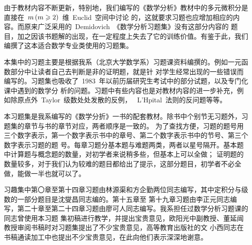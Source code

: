 
\begin{preface}

由于教材内容不断更新，特别地，我们编写的《数学分析》教材中的多元微积分是直接在~$m\mcond{m\geq2}$~维~Euclid~空间中讨论
的，这就要求习题也应增加相应的内容。而原来广泛采用的~Demidovich~《数学分析习题集》没有这部分内容的
题目，加之因该书题解的出现，在一定程度上失去了它的训练价值。有鉴于此，我们编撰了这本适合数学专业类使用的习题集。

本集中的习题主要是根据我系（北京大学数学系）习题课资料编撰的。例如一元函数部分中让读者自己去判断是非的证明题，就是针
对学生经常出现的一些错误而编写的。习题集也吸收了~1983~年以前历届研究生考试中的部分试题，以及专门化课中遇到的数学分
析的问题。习题中有些内容也是对教材内容的进一步补充，例如除原点外~Taylor~级数处处发散的反例，
~L'Hpital~法则的反问题等等。

本习题集是我系编写的《数学分折》一书的配套教材。除书中个别节无习题外，习题集的章节与书的章节对应，两者顺序是一致的。%
为了查找方便，习题的题号用三个数字表示，第一个数字表示书中的章号、第二个数字表示书中的节号、第三个数字表示习题的题
号。每章习题分基本题与难题两类，两者以星号隔开。基本题中计算题与概念题的数量，对初学者来说稍多些，但基本上可以全做；%
证明题的数量较多，对于我们认为较难的题目都给出了提示，这部分题目，初学者不必全做，能做一半也就可以了。

习趣集中第〇章至第十四章习题由林源渠和方企勤两位同志编写，其中定积分与级数的一部分题目是沈燮昌同志编的。第十五章至
第十九章习题由李正元同志编写，第二十章至第二十四章习题由廖可人同志编写。我系担任过数学分析习题课的同志曾使用本习题
集初稿进行教学，并提出宝贵意见，欧阳光中副教授、董延闿教授审阅书稿时对习题集提出了不少宝贵意见，高等教育出版社的文
小西同志在书稿通读加工中也提出不少宝贵意见，在此向他们表示深深地谢意。

\end{preface}

\endinput
